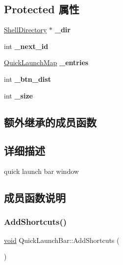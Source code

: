\subsection*{Protected 属性}
\begin{DoxyCompactItemize}
\item 
\mbox{\label{struct_quick_launch_bar_a8a798181025973e71617117005faa9c4}} 
\hyperlink{struct_shell_directory}{Shell\+Directory} $\ast$ {\bfseries \+\_\+dir}
\item 
\mbox{\label{struct_quick_launch_bar_abf70ef1ef3aff845c14ef794b284f32f}} 
int {\bfseries \+\_\+next\+\_\+id}
\item 
\mbox{\label{struct_quick_launch_bar_ae85972e5f1a9d58d7bde1a5d924e6534}} 
\hyperlink{struct_quick_launch_map}{Quick\+Launch\+Map} {\bfseries \+\_\+entries}
\item 
\mbox{\label{struct_quick_launch_bar_ab8ce9f5a6d5427835a7a2be0783192b5}} 
int {\bfseries \+\_\+btn\+\_\+dist}
\item 
\mbox{\label{struct_quick_launch_bar_a996bf1425aacd6b3cd2d1746d4f71d94}} 
int {\bfseries \+\_\+size}
\end{DoxyCompactItemize}
\subsection*{额外继承的成员函数}


\subsection{详细描述}
quick launch bar window 

\subsection{成员函数说明}
\mbox{\label{struct_quick_launch_bar_a47e0d543d791eb4069ef3133a146c3cb}} 
\subsubsection{\texorpdfstring{Add\+Shortcuts()}{AddShortcuts()}}
{\footnotesize\ttfamily \hyperlink{interfacevoid}{void} Quick\+Launch\+Bar\+::\+Add\+Shortcuts (\begin{DoxyParamCaption}{ }\end{DoxyParamCaption})\hspace{0.3cm}{\ttfamily [protected]}}

